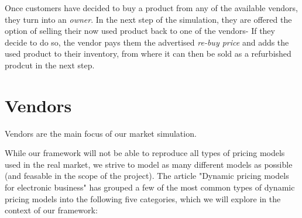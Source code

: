 Once customers have decided to buy a product from any of the available vendors, they turn into an \emph{owner}. In the next step of the simulation, they are offered the option of selling their now used product back to one of the vendors- If they decide to do so, the vendor pays them the advertised \emph{re-buy price} and adds the used product to their inventory, from where it can then be sold as a refurbished prodcut in the next step.

\section{Vendors} \label{section:ExplainVendors}

Vendors are the main focus of our market simulation. 

While our framework will not be able to reproduce all types of pricing models used in the real market, we strive to model as many different models as possible (and feasable in the scope of the project). The article "Dynamic pricing models for electronic business" \cite{dynamicPricingModels} has grouped a few of the most common types of dynamic pricing models into the following five categories, which we will explore in the context of our framework:

